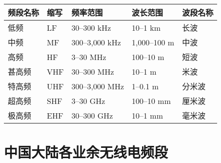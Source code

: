 \begin{longtable}[c]{|l|l|l|l|l|}
  \hline
  \textbf{频段名称} & \textbf{缩写} & \textbf{频率范围}         & \textbf{波长范围} & \textbf{波段名称} \\
  \hline
  低频            & LF          & 30–300 \unit{\kHz}    & 10–1 km       & 长波            \\
  \hline
  中频            & MF          & 300–3,000 \unit{\kHz} & 1,000–100 m   & 中波            \\
  \hline
  高频            & HF          & 3–30 \unit{\MHz}      & 100–10 m      & 短波            \\
  \hline
  甚高频           & VHF         & 30–300 \unit{\MHz}    & 10–1 m        & 米波            \\
  \hline
  特高频           & UHF         & 300–3,000 \unit{\MHz} & 1–0.1 m       & 分米波           \\
  \hline
  超高频           & SHF         & 3–30 \unit{\GHz}      & 100–10 mm     & 厘米波           \\
  \hline
  极高频           & EHF         & 30–300 \unit{\GHz}    & 10–1 mm       & 毫米波           \\
  \hline
\end{longtable}

\newpage

\section{中国大陆各业余无线电频段}

